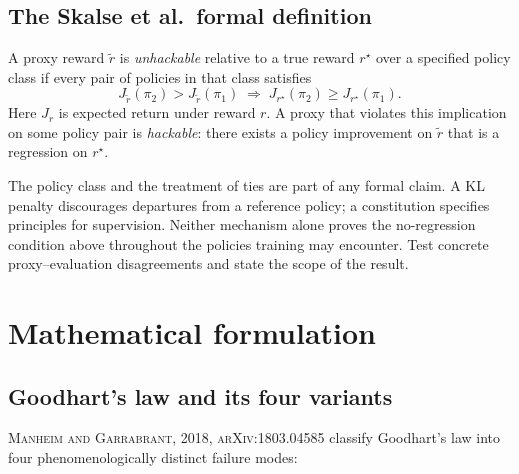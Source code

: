 \documentclass[11pt,oneside]{scrbook}
\begin{document}
\section{The Skalse et al.\ formal definition}

\begin{definition}
A proxy reward $\tilde r$ is \emph{unhackable} relative to a true reward
$r^\star$ over a specified policy class if every pair of policies in that class satisfies
\[
  J_{\tilde r}(\pi_2)>J_{\tilde r}(\pi_1)\;\Longrightarrow\;J_{r^\star}(\pi_2)\ge J_{r^\star}(\pi_1).
\]
Here $J_r$ is expected return under reward $r$. A proxy that violates this
implication on some policy pair is
\emph{hackable}: there exists a policy improvement on $\tilde r$ that is
a regression on $r^\star$.
\end{definition}

The policy class and the treatment of ties are part of any formal claim.
A KL penalty discourages departures from a reference policy; a constitution
specifies principles for supervision. Neither mechanism alone proves the
no-regression condition above throughout the policies training may encounter.
Test concrete proxy--evaluation disagreements and state the scope of the result.

\chapter{Mathematical formulation}

\section{Goodhart's law and its four variants}

\textsc{Manheim and Garrabrant, 2018, arXiv:1803.04585} classify Goodhart's
law into four phenomenologically distinct failure modes:
\end{document}
